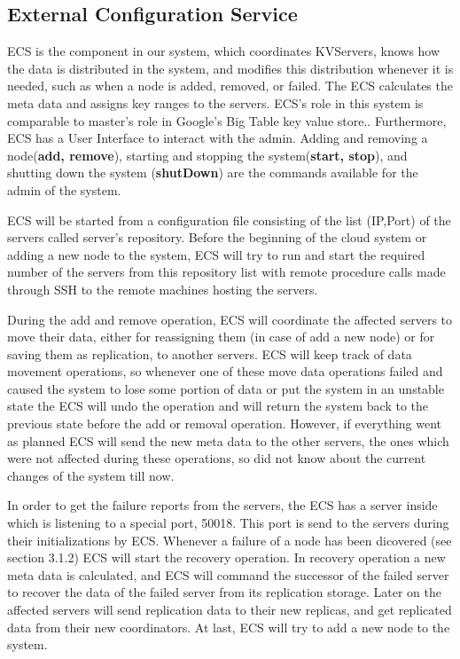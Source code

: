 \documentclass{sig-alternate}
\begin{document}
\subsection{External Configuration Service}
ECS is the component in our system, which coordinates KVServers, knows how the data is distributed in the system, and modifies this distribution whenever it is needed, such as when a node is added, removed, or failed. The ECS calculates the meta data and assigns key ranges to the servers. ECS's role in this system is comparable to master's role in Google's Big Table key value store.\cite{bigTable}. Furthermore, ECS has a User Interface to interact with the admin. Adding and removing a node(\textbf{add, remove}), starting and stopping the system(\textbf{start, stop}), and shutting down the system (\textbf{shutDown}) are the commands available for the admin of the system.

ECS will be started from a configuration file consisting of the list (IP,Port) of the servers called server's repository. Before the beginning of the cloud system or adding a new node to the system, ECS will try to run and start the required number of the servers from this repository list with  remote procedure calls made through SSH to the remote machines hosting the servers. 

During the add and remove operation, ECS will coordinate the affected servers to move their data, either for reassigning them (in case of add a new node) or for saving them as replication, to another servers. ECS will keep track of data movement operations, so whenever one of these move data operations failed and caused the system to lose some portion of data or put the system in an unstable state the ECS will undo the operation and will return the system back to the previous state before the add  or removal operation. However, if everything went as planned ECS will send the new meta data to the other servers, the ones which were not affected during these operations, so did not know about the current changes of the system till now.

In order to get the failure reports from the servers, the ECS has a server inside which is listening to a special port, 50018. This port is send to the servers during their initializations by ECS. Whenever a failure of a node has been dicovered (see section 3.1.2) %
ECS will start the recovery operation. In recovery operation a new meta data is calculated, and ECS will command the successor of the failed server to recover the data of the failed server from its replication storage. Later on the affected servers will send replication data to their new replicas, and get replicated data from their new coordinators. At last, ECS will try to add a new node to the system.
\end{document}
